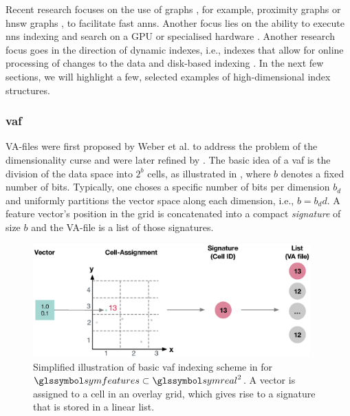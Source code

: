 Recent research focuses on the use of graphs \cite{Shimomura:2021Survey}, for example, proximity graphs \cite{Zhao:2022Approximate} or \acrfull{hnsw} graphs \cite{Malkov:2018Efficient,Chen:2021SPANN}, to facilitate fast \acrshort{anns}. Another focus lies on the ability to execute \acrshort{nns} indexing and search on a GPU \cite{Johnson:2019Billion,Zhao:2020Song} or specialised hardware \cite{Lee:2022Anna}. Another research focus goes in the direction of dynamic indexes, i.e., indexes that allow for online processing of changes to the data \cite{Olafsson:2011Dynamic,Zhao:2022Approximate} and disk-based indexing \cite{Jayaram:2019DiskANN}. In the next few sections, we will highlight a few, selected examples of high-dimensional index structures.

\subsubsection{\texorpdfstring{\acrfull{vaf}}{Vector Approximation File (VAF)}}
\label{section:index_vaf}

VA-files were first proposed by Weber et al. \cite{Weber:1998Va} to address the problem of the dimensionality curse and were later refined by \cite{Ferhatosmanoglu:2000Vector}. The basic idea of a \acrshort{vaf} is the division of the data space into $2^b$ cells, as illustrated in , where $b$ denotes a fixed number of bits. Typically, one choses a specific number of bits per dimension $b_d$ and uniformly partitions the vector space along each dimension, i.e., $b = b_dd$. A feature vector's position in the grid is concatenated into a compact \emph{signature} of size $b$ and the VA-file is a list of those signatures. 

\begin{figure}[tb]
\centering
\includegraphics[width=0.95\textwidth]{figures/vaf}
\caption{Simplified illustration of basic \acrshort{vaf} indexing scheme in for $\symfeatures \subset \symreal^2$. A vector is assigned to a cell in an overlay grid, which gives rise to a signature that is stored in a linear list.}
\label{fig:vaf}
\end{figure}

